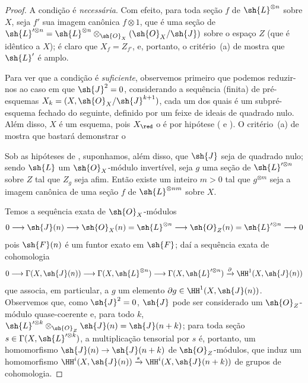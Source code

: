 \documentclass[oneside,10pt]{amsart}
\makeatletter
\newcommand{\ega@arrow}[2]{\mathchoice{#1}{#2}{#2}{#2}}
\renewcommand{\to}{\ega@arrow{\longrightarrow}{\rightarrow}}
\newcommand{\oldpage}[2][]{\marginnote{\normalfont\footnotesize\textbf{#1}~|~#2}\ignorespaces}
\let\EGAOriginalLabel\label
\renewcommand{\label}[1]{\phantomsection\EGAOriginalLabel{#1}}
\makeatother
\begin{document}
\begin{proof}
A condição é \emph{necessária}.
Com efeito, para toda seção $f$ de $\sh{L}^{\otimes n}$ sobre $X$, seja $f'$ sua imagem canônica $f\otimes1$, que é uma seção de $\sh{L}'^{\otimes n}=\sh{L}^{\otimes n}\otimes_{\sh{O}_X}(\sh{O}_X/\sh{J})$ sobre o espaço $Z$ (que é idêntico a $X$);
é claro que $X_f=Z_{f'}$, e, portanto, o critério~(a) de  mostra que $\sh{L}'$ é amplo.

Para ver que a condição é \emph{suficiente}, observemos primeiro que podemos reduzir-nos ao caso em que $\sh{J}^2=0$, considerando a sequência (finita) de pré-esquemas $X_k=(X,\sh{O}_X/\sh{J}^{k+1})$, cada um dos quais é um subpré-esquema fechado do seguinte, definido por um feixe de ideais de quadrado nulo.
Além disso, $X$ é um esquema, pois $X_\red$ o é por hipótese ( e ).
O critério~(a) de  mostra que bastará demonstrar o
  \begin{lemma}[4.5.13.1]
  \label{II.4.5.13.1}
  Sob as hipóteses de , suponhamos, além disso, que $\sh{J}$ seja de quadrado nulo;
  sendo $\sh{L}$ um $\sh{O}_X$-módulo invertível, seja $g$ uma seção de $\sh{L}'^{\otimes n}$ sobre $Z$ tal que $Z_g$ seja afim.
  Então existe um inteiro $m>0$ tal que $g^{\otimes m}$ seja a imagem canônica de uma seção $f$ de $\sh{L}^{\otimes nm}$ sobre $X$.
  \end{lemma}

  Temos a sequência exata de $\sh{O}_X$-módulos
  \[
    0\to\sh{J}(n)\to\sh{O}_X(n)=\sh{L}^{\otimes n}\to\sh{O}_Z(n)=\sh{L}'^{\otimes n}\to0
  \]
\oldpage[II]{88}
  pois $\sh{F}(n)$ é um funtor exato em $\sh{F}$;
  daí a sequência exata de cohomologia
  \[
    0\to\Gamma(X,\sh{J}(n))\to\Gamma(X,\sh{L}^{\otimes n})\to\Gamma(X,\sh{L}'^{\otimes n})\xrightarrow{\partial}\HH^1(X,\sh{J}(n))
  \]
  que associa, em particular, a $g$ um elemento $\partial g\in\HH^1(X,\sh{J}(n))$.
  Observemos que, como $\sh{J}^2=0$, $\sh{J}$ pode ser considerado um $\sh{O}_Z$-módulo quase-coerente e, para todo $k$, $\sh{L}'^{\otimes k}\otimes_{\sh{O}_Z}\sh{J}(n)=\sh{J}(n+k)$;
  para toda seção $s\in\Gamma(X,\sh{L}'^{\otimes k})$, a multiplicação tensorial por $s$ é, portanto, um homomorfismo $\sh{J}(n)\to\sh{J}(n+k)$ de $\sh{O}_Z$-módulos, que induz um homomorfismo $\HH^i(X,\sh{J}(n))\xrightarrow{s}\HH^i(X,\sh{J}(n+k))$ de grupos de cohomologia.


\end{proof}
\end{document}
